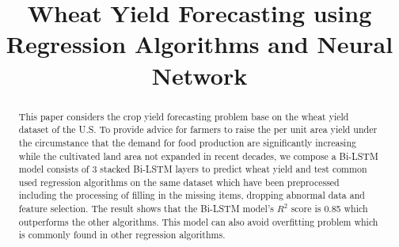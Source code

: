 \documentclass[conference, a4paper]{IEEEtran}
\begin{document}
\title{Wheat Yield Forecasting using Regression Algorithms and Neural Network}
\author{
\and
{}
\and
{}
\and
{}
}

\maketitle

\begin{abstract}
  This paper considers the crop yield forecasting problem base on the wheat yield dataset of the U.S. To provide advice for farmers to raise the per unit area yield under the circumstance that the demand for food production are significantly increasing while the cultivated land area not expanded in recent decades, we compose a Bi-LSTM model consists of 3 stacked Bi-LSTM layers to predict wheat yield and test common used regression algorithms on the same dataset which have been preprocessed including the processing of filling in the missing items, dropping abnormal data and feature selection. The result shows that the Bi-LSTM model's $R^2$ score is 0.85 which outperforms the other algorithms. This model can also avoid overfitting problem which is commonly found in other regression algorithms. 
\end{abstract}
\end{document}
